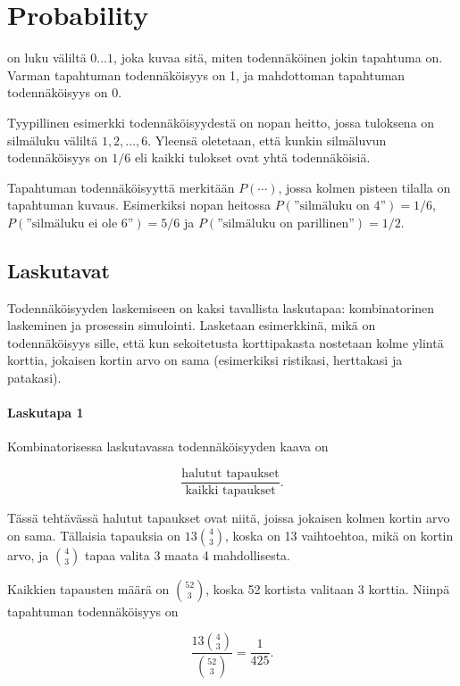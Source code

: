 \chapter{Probability}


 on luku väliltä $0 \ldots 1$,
joka kuvaa sitä, miten todennäköinen jokin
tapahtuma on.
Varman tapahtuman todennäköisyys on 1,
ja mahdottoman tapahtuman todennäköisyys on 0.

Tyypillinen esimerkki todennäköisyydestä
on nopan heitto, jossa tuloksena
on silmäluku väliltä $1,2,\ldots,6$.
Yleensä oletetaan, että kunkin silmäluvun
todennäköisyys on $1/6$
eli kaikki tulokset ovat yhtä todennäköisiä.

Tapahtuman todennäköisyyttä merkitään $P(\cdots)$,
jossa kolmen pisteen tilalla on tapahtuman kuvaus.
Esimerkiksi nopan heitossa
$P(\textrm{''silmäluku on 4''})=1/6$,
$P(\textrm{''silmäluku ei ole 6''})=5/6$
ja $P(\textrm{''silmäluku on parillinen''})=1/2$.

\section{Laskutavat}

Todennäköisyyden laskemiseen on kaksi
tavallista laskutapaa:
kombinatorinen laskeminen ja prosessin simulointi.
Lasketaan esimerkkinä, mikä on todennäköisyys sille,
että kun sekoitetusta korttipakasta nostetaan
kolme ylintä korttia, jokaisen kortin arvo on sama
(esimerkiksi ristikasi, herttakasi ja patakasi).

\subsubsection*{Laskutapa 1}

Kombinatorisessa laskutavassa
todennäköisyyden kaava on

\[\frac{\textrm{halutut tapaukset}}{\textrm{kaikki tapaukset}}.\]

Tässä tehtävässä halutut tapaukset ovat niitä,
joissa jokaisen kolmen kortin arvo on sama.
Tällaisia tapauksia on $13 {4 \choose 3}$,
koska on 13 vaihtoehtoa, mikä on kortin arvo,
ja ${4 \choose 3}$ tapaa valita 3 maata 4 mahdollisesta.

Kaikkien tapausten määrä on ${52 \choose 3}$,
koska 52 kortista valitaan 3 korttia.
Niinpä tapahtuman todennäköisyys on

\[\frac{13 {4 \choose 3}}{{52 \choose 3}} = \frac{1}{425}.\]

